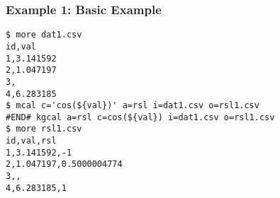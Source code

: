 \subsubsection*{Example 1: Basic Example}



\begin{Verbatim}[baselinestretch=0.7,frame=single]
$ more dat1.csv
id,val
1,3.141592
2,1.047197
3,
4,6.283185
$ mcal c='cos(${val})' a=rsl i=dat1.csv o=rsl1.csv
#END# kgcal a=rsl c=cos(${val}) i=dat1.csv o=rsl1.csv
$ more rsl1.csv
id,val,rsl
1,3.141592,-1
2,1.047197,0.5000004774
3,,
4,6.283185,1
\end{Verbatim}
